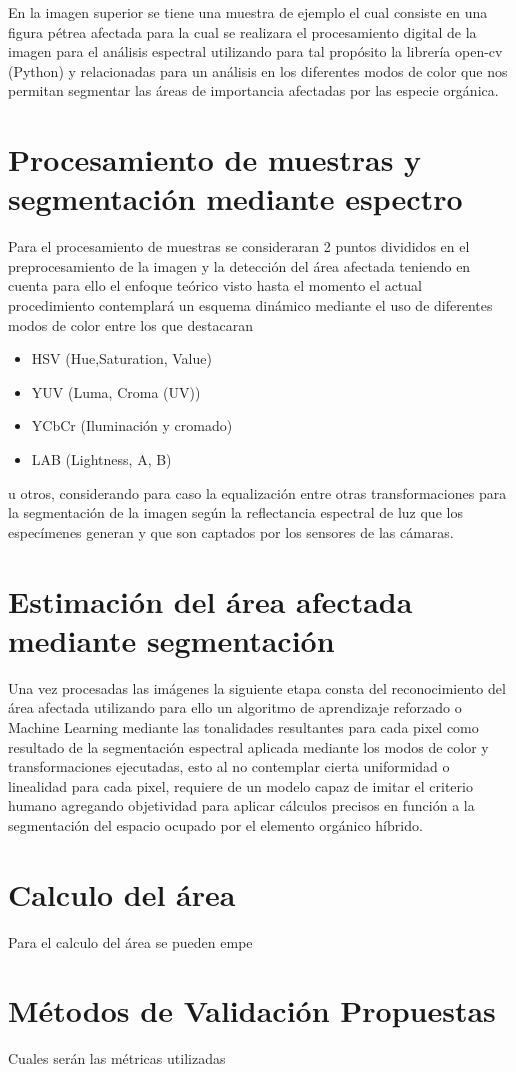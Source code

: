 En la imagen superior se tiene una muestra de ejemplo el cual consiste en una figura pétrea afectada para la cual se realizara el procesamiento  digital de la imagen para el análisis espectral utilizando para tal propósito la librería open-cv (Python) y relacionadas para un análisis en los diferentes modos de color que nos permitan segmentar las áreas de importancia afectadas por las especie orgánica.

\section{Procesamiento de muestras y segmentación mediante espectro}
Para el procesamiento de muestras se consideraran 2 puntos divididos en el preprocesamiento de la imagen y la detección del área afectada teniendo en cuenta para ello el enfoque teórico visto hasta el momento el actual procedimiento contemplará un esquema dinámico mediante el uso de diferentes modos de color entre los que destacaran

\begin{itemize}
	\item HSV (Hue,Saturation, Value)
	\item YUV (Luma, Croma (UV))
	\item YCbCr (Iluminación y cromado)
	\item LAB (Lightness, A, B)
\end{itemize}

u otros, considerando para caso la equalización entre otras transformaciones para la segmentación de la imagen según la reflectancia espectral de luz que los especímenes generan y que son captados por los sensores de las cámaras.

\section{Estimación del área afectada mediante segmentación}

Una vez procesadas las imágenes la siguiente etapa consta del reconocimiento del área afectada utilizando para ello un algoritmo de aprendizaje reforzado o Machine Learning mediante las tonalidades resultantes para cada pixel como resultado de la segmentación espectral aplicada mediante los modos de color y transformaciones ejecutadas, esto al no contemplar cierta uniformidad o linealidad para cada pixel, requiere de un modelo capaz de imitar el criterio humano agregando objetividad para aplicar cálculos precisos en función a la segmentación del espacio ocupado por el elemento orgánico híbrido.

\section{Calculo del área}

Para el calculo del área se pueden empe

\section{Métodos de Validación Propuestas}
Cuales serán las métricas utilizadas 